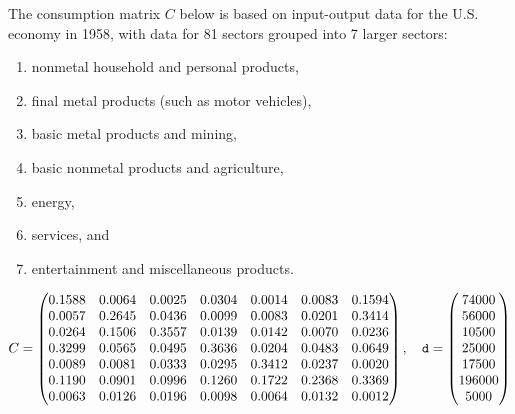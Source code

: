 % 
\begin{lab}
    The consumption matrix $C$ below is based on input-output data for the U.S. economy in
    1958, with data for 81 sectors grouped into 7 larger sectors: 
    \begin{enumerate}
        \item nonmetal household and personal products,
        \item final metal products (such as motor vehicles),
        \item basic metal products and mining,
        \item basic nonmetal products and agriculture,
        \item energy,
        \item services, and
        \item entertainment and miscellaneous products.
    \end{enumerate}
   
    \[ C = \begin{pmatrix} 0.1588 & 0.0064 & 0.0025 & 0.0304 & 0.0014 & 0.0083 & 0.1594 \\
                0.0057 & 0.2645 & 0.0436 & 0.0099 & 0.0083 & 0.0201 & 0.3414 \\
                0.0264 & 0.1506 & 0.3557 & 0.0139 & 0.0142 & 0.0070 & 0.0236 \\
                0.3299 & 0.0565 & 0.0495 & 0.3636 & 0.0204 & 0.0483 & 0.0649 \\
                0.0089 & 0.0081 & 0.0333 & 0.0295 & 0.3412 & 0.0237 & 0.0020 \\
                0.1190 & 0.0901 & 0.0996 & 0.1260 & 0.1722 & 0.2368 & 0.3369 \\
                0.0063 & 0.0126 & 0.0196 & 0.0098 & 0.0064 & 0.0132 & 0.0012
        \end{pmatrix}, \quad \texttt{d} = \begin{pmatrix} 74000\\56000\\10500\\25000\\17500\\196000\\5000 \end{pmatrix} \]


\end{lab}
